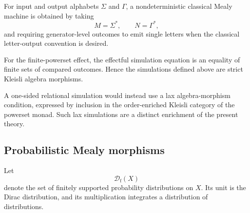 For input and output alphabets \(\Sigma\) and \(\Gamma\), a nondeterministic
classical Mealy machine is obtained by taking
\[
    M=\Sigma^\ast,
    \qquad
    N=\Gamma^\ast,
\]
and requiring generator-level outcomes to emit single letters when the
classical letter-output convention is desired.

\begin{remark}
\label{rem:strictness-nondeterministic-simulations}
    For the finite-powerset effect, the effectful simulation equation is an
    equality of finite sets of compared outcomes. Hence the simulations
    defined above are strict Kleisli algebra morphisms.

    A one-sided relational simulation would instead use a lax
    algebra-morphism condition, expressed by inclusion in the
    order-enriched Kleisli category of the powerset monad. Such lax
    simulations are a distinct enrichment of the present theory.
\end{remark}

\subsection{Probabilistic Mealy morphisms}
\label{subsec:probabilistic-mealy-morphisms}

Let
\[
    \mathcal D_{\mathrm f}(X)
\]
denote the set of finitely supported probability distributions on \(X\). Its
unit is the Dirac distribution, and its multiplication integrates a
distribution of distributions.

